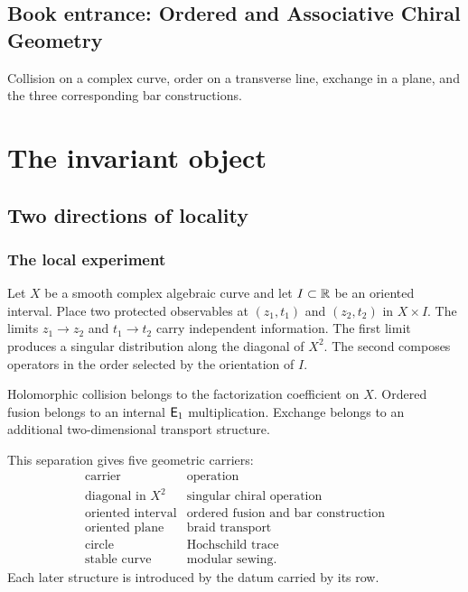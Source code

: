 \cleardoublepage
{}
{}
\chapter*{Book entrance: Ordered and Associative Chiral Geometry}
\begin{summarybox}
Collision on a complex curve, order on a transverse line, exchange in a plane, and the three corresponding bar constructions.
\end{summarybox}
\part{The invariant object}

\chapter{Two directions of locality}
\section{The local experiment}
Let $X$ be a smooth complex algebraic curve and let $I\subset\mathbb R$ be an oriented interval. Place two protected observables at $(z_1,t_1)$ and $(z_2,t_2)$ in $X\times I$. The limits $z_1\to z_2$ and $t_1\to t_2$ carry independent information. The first limit produces a singular distribution along the diagonal of $X^2$. The second composes operators in the order selected by the orientation of $I$.

\begin{principle}
Holomorphic collision belongs to the factorization coefficient on $X$. Ordered fusion belongs to an internal $\mathsf E_1$ multiplication. Exchange belongs to an additional two-dimensional transport structure.
\end{principle}

This separation gives five geometric carriers:
\[
\begin{array}{c|c}
\text{carrier}&\text{operation}\\ \hline
\text{diagonal in }X^2&\text{singular chiral operation}\\
\text{oriented interval}&\text{ordered fusion and bar construction}\\
\text{oriented plane}&\text{braid transport}\\
\text{circle}&\text{Hochschild trace}\\
\text{stable curve}&\text{modular sewing}.
\end{array}
\]
Each later structure is introduced by the datum carried by its row.


